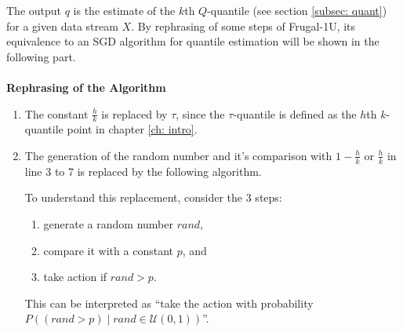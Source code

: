 The output $q$ is the estimate of the $k$th $Q$-quantile (see section \ref{subsec: quant}) for a given data stream $X$. 
By rephrasing of some steps of Frugal-1U, 
its equivalence to an SGD algorithm for quantile estimation will be shown in the following part.
\\\\
\textbf{Rephrasing of the Algorithm} \label{replacements}
\begin{enumerate}
    \item The constant $\frac{h}{k}$ is replaced by $\tau$, since the $\tau$-quantile is defined
     as the $h$th $k$-quantile point in chapter \ref{ch: intro}.
    \item The generation of the random number and it's comparison with $1-\frac{h}{k}$ or $\frac{h}{k}$
    in line 3 to 7 is replaced by the following algorithm.
    \begin{algorithm}
        \begin{algorithmic}[1]
            \setcounter{ALG@line}{2}
            \State{ }   
            \EndIf 
        \end{algorithmic}
    \end{algorithm}

    
    To understand this replacement, consider the 3 steps:
    \begin{enumerate}[label={(\roman*)}]
    \item generate a random number $rand$, 
    \item compare it with a constant $p$, and
    \item take action if $rand > p$. 
    \end{enumerate}
    This can be interpreted as ``take the action with probability 
    $P((rand > p) \mid rand \in \mathcal{U}(0,1))$''. 


\end{enumerate}
